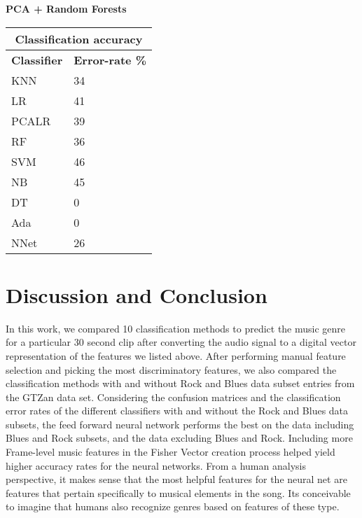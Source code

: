 \documentclass{article}
\begin{document}
\begin{multicols}{2}
\newline
\newline
\textbf{PCA + Random Forests} 
\newline
\newline
\begin{tabular}{ |p{2cm}|p{2.3cm}|}
\hline
\multicolumn{2}{|c|}{\textbf{Classification accuracy}} \\
\hline
\textbf{Classifier} & \textbf{Error-rate \%} \\
\hline
KNN & 34 \\
LR & 41  \\
PCALR & 39 \\
RF    &  36 \\
SVM & 46 \\
NB & 45 \\
DT & 0 \\
Ada & 0 \\
NNet & 26 \\
\hline
\end{tabular}

\section{Discussion and Conclusion}
In this work, we compared 10 classification methods to predict the music genre for a particular 30 second clip after converting the audio signal to a digital vector representation of the features we listed above. After performing manual feature selection and picking the most discriminatory features, we also compared the classification methods with and without Rock and Blues data subset entries from the GTZan data set. Considering the confusion matrices and the classification error rates of the different classifiers with and without the Rock and Blues data subsets, the feed forward neural network performs the best on the data including Blues and Rock subsets, and the data excluding Blues and Rock. Including more Frame-level music features in the Fisher Vector creation process helped yield higher accuracy rates for the neural networks. From a human analysis perspective, it makes sense that the most helpful features for the neural net are features that pertain specifically to musical elements in the song. Its conceivable to imagine that humans also recognize genres based on features of these type.


\end{multicols}
\end{document}
